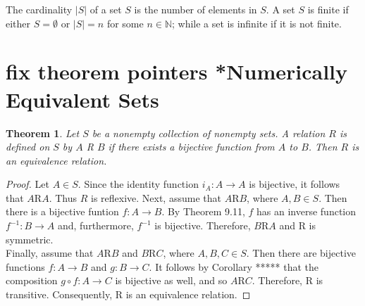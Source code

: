 \documentclass[10pt]{report}
\newtheorem{thm2}{Theorem}[section]
\begin{document}
The cardinality $|S|$ of a set $S$ is the number of elements in $S$. A set $S$ is finite if either $S=\emptyset$ or $|S|=n$ for some $n\in \mathbb{N}$; while a set is infinite if it is not finite. 
\section{fix theorem pointers *Numerically Equivalent Sets}
\begin{thm2}
Let $S$ be a nonempty collection of nonempty sets. A relation $R$ is defined on $S$ by $A$ R $B$ if there exists a bijective function from $A$ to $B$. Then $R$ is an equivalence relation.
\end{thm2}
\begin{proof}
Let $A\in S$. Since the identity function $i_A:A\to A$ is bijective, it follows that $A$R$A$. Thus $R$ is reflexive. Next, assume that $A$R$B$, where $A,B\in S$. Then there is a bijective funtion $f:A\to B$. By Theorem 9.11, $f$ has an inverse function $f^{-1}:B\to A$ and, furthermore, $f^{-1}$ is bijective. Therefore, $B$R$A$ and R is symmetric.\\
Finally, assume that $A$R$B$ and $B$R$C$, where $A,B,C\in S$. Then there are bijective functions $f:A\to B$ and $g:B\to C$. It follows by Corollary ***** that the composition $g\circ f:A\to C$ is bijective as well, and so $A$R$C$. Therefore, R is transitive. Consequently, R is an equivalence relation.
\end{proof}
\end{document}
